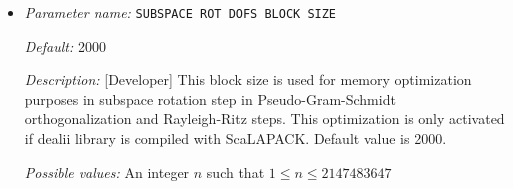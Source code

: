 \begin{itemize}
{\it Default:} 0


{\it Description:} [Standard] Uses a processor grid of SCALAPACKPROCS times SCALAPACKPROCS for parallel distribution of the subspace projected matrix in the Rayleigh-Ritz step and the overlap matrix in the Pseudo-Gram-Schmidt step. Default value is 0 for which a thumb rule is used (see http://netlib.org/scalapack/slug/node106.html\#SECTION04511000000000000000). This parameter is only used if dealii library is compiled with ScaLAPACK.


{\it Possible values:} An integer $n$ such that $0\leq n \leq 300$
\item {\it Parameter name:} {\tt SUBSPACE ROT DOFS BLOCK SIZE}
\label{parameters:SCF parameters/Eigen_2dsolver_2fChebyshev solver related parameters/SUBSPACE ROT DOFS BLOCK SIZE}
\label{parameters:SCF_20parameters/Eigen_2dsolver_2fChebyshev_20solver_20related_20parameters/SUBSPACE_20ROT_20DOFS_20BLOCK_20SIZE}




{\it Default:} 2000


{\it Description:} [Developer] This block size is used for memory optimization purposes in subspace rotation step in Pseudo-Gram-Schmidt orthogonalization and Rayleigh-Ritz steps. This optimization is only activated if dealii library is compiled with ScaLAPACK. Default value is 2000.


{\it Possible values:} An integer $n$ such that $1\leq n \leq 2147483647$
\end{itemize}
